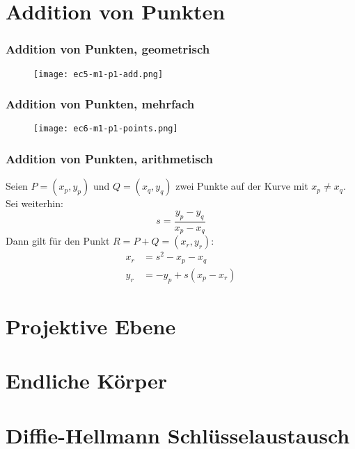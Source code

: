 \documentclass{beamer}
\begin{document}
\section{Addition von Punkten}
\begin{frame}
  \frametitle{Addition von Punkten, geometrisch}
  \begin{figure}
    \texttt{[image: ec5-m1-p1-add.png]}
  \end{figure}
\end{frame}

\begin{frame}
  \frametitle{Addition von Punkten, mehrfach}
  \begin{figure}
    \texttt{[image: ec6-m1-p1-points.png]}
  \end{figure}
\end{frame}

\begin{frame}
  \frametitle{Addition von Punkten, arithmetisch}
  \begin{theorem}[Additionsformel]
    Seien $P = (x_p, y_p)$ und $Q=(x_q, y_q)$ zwei Punkte auf der Kurve mit
    $x_p \ne x_q$. Sei weiterhin:
    \begin{equation*}
      s = \frac{y_p - y_q}{x_p - x_q}
    \end{equation*}
    Dann gilt für den Punkt $R = P + Q = (x_r, y_r)$:
    \begin{equation}
      \begin{split}
        x_r & = s^2 - x_p - x_q \\
        y_r & = -y_p + s(x_p - x_r)
      \end{split}
    \end{equation}
  \end{theorem}
\end{frame}

\section{Projektive Ebene}
\section{Endliche Körper}
\section{Diffie-Hellmann Schlüsselaustausch}
\begin{frame}
  \tableofcontents
\end{frame}
\end{document}
